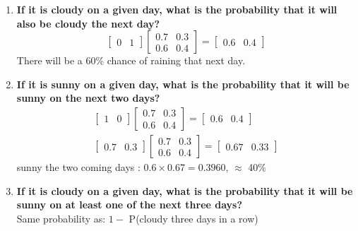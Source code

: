 \documentclass[a4paper]{article}
\begin{document}
\begin{enumerate}
	\item \textbf{ If it is cloudy on a given day, what is the probability that it will also be cloudy the next day?
	}\\	

	\begin{equation}
	\begin{bmatrix} 0& 1 \end{bmatrix}\begin{bmatrix} 0.7& 0.3 \\ 0.6& 0.4 \end{bmatrix} = \begin{bmatrix} 0.6& 0.4 \end{bmatrix} 
	\end{equation}
	There will be a 60\% chance of raining that next day. 

	\item \textbf{If it is sunny on a given day, what is the probability that it will be sunny on the next two days?
	} \\
	\begin{equation}
	\begin{aligned}
	\begin{bmatrix} 1& 0 \end{bmatrix}\begin{bmatrix} 0.7& 0.3 \\ 0.6& 0.4 \end{bmatrix} = \begin{bmatrix} 0.6& 0.4 \end{bmatrix} \\
	\begin{bmatrix} 0.7& 0.3 \end{bmatrix}\begin{bmatrix} 0.7& 0.3 \\ 0.6& 0.4 \end{bmatrix} = \begin{bmatrix} 0.67& 0.33 \end{bmatrix} 
	\end{aligned}
	\end{equation} 
	sunny the two coming days : $0.6 \times 0.67 = 0.3960$, $\approx$ 40\%

	\item \textbf{ If it is cloudy on a given day, what is the probability that it will be sunny on at least one of the next three days?
	}\\
	Same probability as: $1-$ P(cloudy three days in a row)


\end{enumerate}
\end{document}
